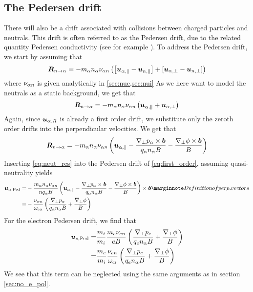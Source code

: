 \subsection{The Pedersen drift}
%
There will also be a drift associated with collisions between charged particles and neutrals.
This drift is often referred to as the Pedersen drift, due to the related quantity Pedersen conductivity (see for example \cite{Baumjohann1997book}).
To address the Pedersen drift, we start by assuming that
%
\begin{align*}
    \boldsymbol{R}_{n\to\alpha} =
    -
     m_\alpha n_\alpha \nu_{\alpha n}\left(
        \left[\boldsymbol{u}_{\alpha,\|}-\boldsymbol{u}_{n,\|} \right]
        +
        \left[\boldsymbol{u}_{\alpha,\perp}-\boldsymbol{u}_{n,\perp} \right]
        \right)
\end{align*}
%
where $\nu_{\alpha n}$ is given analytically in \cref{sec:nue,sec:nui}
As we here want to model the neutrals as a static background, we get that
%
\begin{align*}
    \boldsymbol{R}_{n\to\alpha} =
    -
     m_\alpha n_\alpha \nu_{\alpha n}\left(
        \boldsymbol{u}_{\alpha,\|}
        +
        \boldsymbol{u}_{\alpha,\perp}
        \right)
\end{align*}
%
Again, since $\boldsymbol{u}_{\alpha,R}$ is already a first order drift, we substitute only the zeroth order drifts into the perpendicular velocities.
We get that
%
\begin{align}
    \boldsymbol{R}_{n\to\alpha} =
    - m_\alpha n_\alpha \nu_{\alpha n}\left( \boldsymbol{u}_{\alpha,\|}
    - \frac{\nabla_\perp p_\alpha \times \boldsymbol{b}}{q_\alpha n_\alpha B}
    - \frac{\nabla_\perp \phi \times \boldsymbol{b}}{B} \right)
    \label{eq:neut_res}
\end{align}
%
Inserting \cref{eq:neut_res} into the Pedersen drift of \cref{eq:first_order}, assuming quasi-neutrality yields
%
\begin{align*}
    \ve{u}_{\a,\text{Ped}}
    =&
    - \frac{ m_\a n_\a \nu_{\a n} }{n q_\a B} \L( \ve{u}_{\a,\|}
    - \frac{\grad_\perp p_\a \times \ve{b}}{q_\a n_\a B}
    - \frac{\grad_\perp \phi \times \ve{b}}{B} \R) \times\ve{b}
    \note{Definition of perp. vectors}
    \\
    =&
    - \frac{\nu_{\a n} }{\om_{c\a}}
    \L(\frac{\grad_\perp p_\a}{q_\a n_\a B}
    + \frac{\grad_\perp \phi}{B} \R)
\end{align*}
%
For the electron Pedersen drift, we find that
%
\begin{align*}
    \boldsymbol{u}_{e,\text{Ped}}
    =&
    \frac{m_i}{m_i}\frac{ m_e \nu_{e n} }{e B}
    \left(\frac{\nabla_\perp p_e}{q_e n_\alpha B}
    + \frac{\nabla_\perp \phi}{B} \right)
    \\
    =&
    \frac{m_e}{m_i}\frac{\nu_{e n} }{\omega_{ci}}
    \left(\frac{\nabla_\perp p_e}{q_e n_\alpha B}
    + \frac{\nabla_\perp \phi}{B} \right)
\end{align*}
%
We see that this term can be neglected using the same arguments as in section \cref{sec:no_e_pol}.

